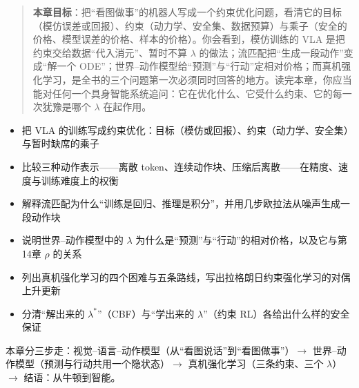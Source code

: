 \begin{quote}
\textbf{本章目标}：把“看图做事”的机器人写成一个约束优化问题，看清它的目标（模仿误差或回报）、约束（动力学、安全集、数据预算）与乘子（安全的价格、模型误差的价格、样本的价格）。你会看到，模仿训练的 VLA 是把约束交给数据“代入消元”、暂时不算 $\lambda$ 的做法；流匹配把“生成一段动作”变成“解一个 ODE”；世界--动作模型给“预测”与“行动”定相对价格；而真机强化学习，是全书的三个问题第一次必须同时回答的地方。读完本章，你应当能对任何一个具身智能系统追问：它在优化什么、它受什么约束、它的每一次犹豫是哪个 $\lambda$ 在起作用。
\end{quote}

\begin{tcolorbox}[colback=green!5, colframe=green!60!black, title=学完这章，你将能够...]
\begin{itemize}
    \item 把 VLA 的训练写成约束优化：目标（模仿或回报）、约束（动力学、安全集）与暂时缺席的乘子
    \item 比较三种动作表示——离散 token、连续动作块、压缩后离散——在精度、速度与训练难度上的权衡
    \item 解释流匹配为什么“训练是回归、推理是积分”，并用几步欧拉法从噪声生成一段动作块
    \item 说明世界--动作模型中的 $\lambda$ 为什么是“预测”与“行动”的相对价格，以及它与第14章 $\rho$ 的关系
    \item 列出真机强化学习的四个困难与五条路线，写出拉格朗日约束强化学习的对偶上升更新
    \item 分清“解出来的 $\lambda^*$”（CBF）与“学出来的 $\lambda$”（约束 RL）各给出什么样的安全保证
\end{itemize}
\end{tcolorbox}

本章分三步走：视觉--语言--动作模型（从“看图说话”到“看图做事”）$\to$ 世界--动作模型（预测与行动共用一个隐状态）$\to$ 真机强化学习（三条约束、三个 $\lambda$）$\to$ 结语：从牛顿到智能。

